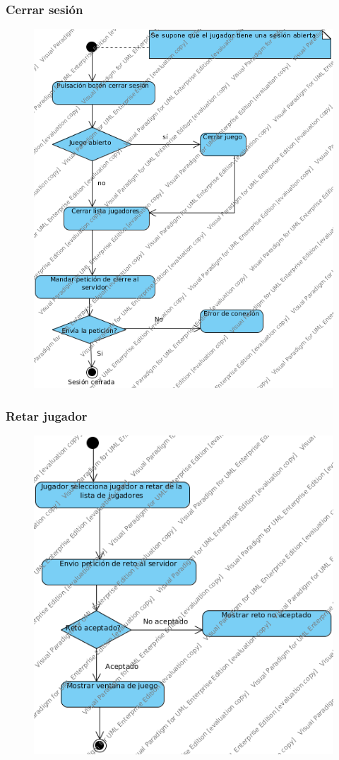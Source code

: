 \subsubsection{Cerrar sesión}
 \begin{figure}[h]
 \centering
 \includegraphics[scale=0.5]{img/ms_CerrarSesionCliente.png}
 \end{figure}
\subsubsection{Retar jugador}
 \begin{figure}[h]
 \centering
 \includegraphics[scale=0.5]{img/ms_RetarJugadorCliente.png}
 \end{figure}
